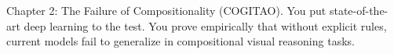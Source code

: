 Chapter 2: The Failure of Compositionality (COGITAO). You put state-of-the-art deep learning to the test. You prove empirically that without explicit rules, current models fail to generalize in compositional visual reasoning tasks.
